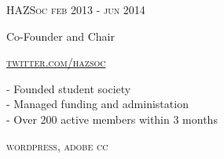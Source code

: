 {
    \textsc{\small{HAZSoc
            \hfill
            {\raggedleft
                feb 2013 - jun 2014
            }
        }
    }

    {\raggedright\large {
        Co-Founder and Chair
    } \\}

    \textsc{\small\href{http://www.twitter.com/hazsoc}{twitter.com/hazsoc}}

    \normalsize{
        - Founded student society \\
        - Managed funding and administation \\
        - Over 200 active members within 3 months
    }

    \textsc{\small{\color{highlight}
        wordpress,
        adobe cc
    }} \\
}
